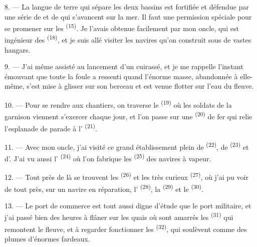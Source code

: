 8. --- La langue de terre qui sépare les deux bassins est fortifiée et défendue
par une série de  et de  qui s'avancent sur
la mer. Il faut une permission spéciale pour se promener sur les
 \textsuperscript{(15)}. Je l'avais obtenue facilement par mon
oncle, qui est ingénieur des 
\textsuperscript{(18)}, et je suis allé visiter les navires qu'on construit sous
de vastes hangars.

9. --- J'ai même assisté au lancement d'un cuirassé, et je me rappelle l'instant
émouvant que toute la foule a ressenti quand l'énorme masse, abandonnée à
elle-même, s'est mise à glisser sur son berceau et est venue flotter sur l'eau
du fleuve.

10. --- Pour se rendre aux chantiers, on traverse le  \textsuperscript{(19)} où les soldats de la garnison viennent
s'exercer chaque jour, et l'on passe sur une 
\textsuperscript{(20)} de fer qui relie l'esplanade de parade à
l' \textsuperscript{(21)}.

\VUsaut{3.0mm}
\VUsaut{3.0mm}

11. --- Avec mon oncle, j'ai visité ce grand établissement plein de
 \textsuperscript{(22)}, de 
\textsuperscript{(23)} et d'. J'ai vu aussi l' \textsuperscript{(24)} où l'on fabrique les 
\textsuperscript{(25)} des navires à vapeur.

12. --- Tout près de là se trouvent les 
\textsuperscript{(26)} et les très curieux 
\textsuperscript{(27)}, où j'ai pu voir de tout près, sur un navire en
réparation, l' \textsuperscript{(28)}, la 
\textsuperscript{(29)} et le  \textsuperscript{(30)}.

13. --- Le port de commerce est tout aussi digne d'étude que le port militaire,
et j'ai passé bien des heures à flâner sur les quais où sont amarrés les
 \textsuperscript{(31)} qui remontent le fleuve, et à
regarder fonctionner les  \textsuperscript{(32)}, qui
soulèvent comme des plumes d'énormes fardeaux.

\VUsaut{4.0mm}
\VUsaut{3.0mm}


